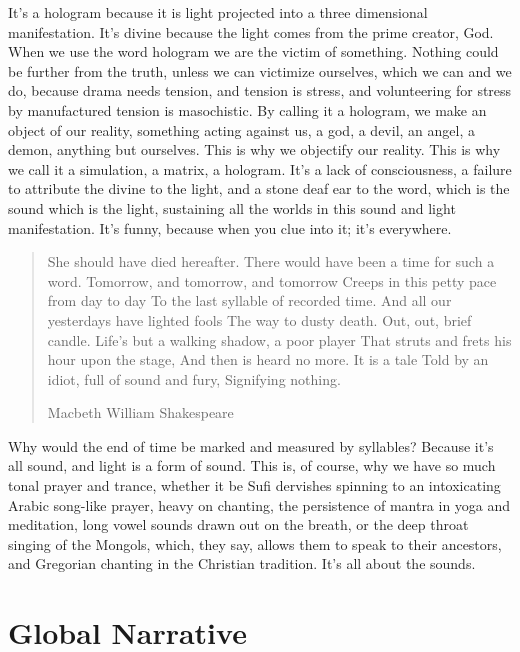 \documentclass[letterpaper,11pt,twoside,titlepage,onecolumn,openany]{book}
\begin{document}
It's a hologram because it is light projected into a three dimensional
manifestation. It's divine because the light comes from the prime
creator, God. When we use the word hologram we are the victim of
something. Nothing could be further from the truth, unless we can
victimize ourselves, which we can and we do, because drama needs
tension, and tension is stress, and volunteering for stress by
manufactured tension is masochistic. By calling it a hologram, we make
an object of our reality, something acting against us, a god, a devil,
an angel, a demon, anything but ourselves. This is why we objectify our
reality. This is why we call it a simulation, a matrix, a hologram. It's
a lack of consciousness, a failure to attribute the divine to the light,
and a stone deaf ear to the word, which is the sound which is the light,
sustaining all the worlds in this sound and light manifestation. It's
funny, because when you clue into it; it's everywhere.

\begin{quote}
She should have died hereafter.
There would have been a time for such a word.
Tomorrow, and tomorrow, and tomorrow
Creeps in this petty pace from day to day
To the last syllable of recorded time.
And all our yesterdays have lighted fools
The way to dusty death. Out, out, brief candle.
Life’s but a walking shadow, a poor player
That struts and frets his hour upon the stage,
And then is heard no more. It is a tale
Told by an idiot, full of sound and fury,
Signifying nothing.

Macbeth
William Shakespeare
\end{quote}

Why would the end of time be marked and measured by syllables? Because
it's all sound, and light is a form of sound. This is, of course, why we
have so much tonal prayer and trance, whether it be Sufi dervishes
spinning to an intoxicating Arabic song-like prayer, heavy on chanting,
the persistence of mantra in yoga and meditation, long vowel sounds
drawn out on the breath, or the deep throat singing of the Mongols,
which, they say, allows them to speak to their ancestors, and Gregorian
chanting in the Christian tradition. It's all about the sounds.

\section*{Global Narrative}\label{global-narrative}
\end{document}
